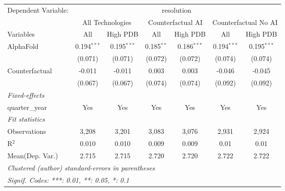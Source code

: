 \begingroup
\centering
\begin{tabular}{lcccccc}
   \tabularnewline \midrule \midrule
   Dependent Variable: & \multicolumn{6}{c}{resolution}\\
 & \multicolumn{2}{c}{All Technologies} & \multicolumn{2}{c}{Counterfactual AI} & \multicolumn{2}{c}{Counterfactual No AI} \\
\cmidrule(lr){1-1}\cmidrule(lr){2-3} \cmidrule(lr){4-5} \cmidrule(lr){6-7}
Variables & \multicolumn{1}{c}{All} & \multicolumn{1}{c}{High PDB} & \multicolumn{1}{c}{All} & \multicolumn{1}{c}{High PDB} & \multicolumn{1}{c}{All} & \multicolumn{1}{c}{High PDB} \\
\cmidrule(lr){1-1}\cmidrule(lr){2-2} \cmidrule(lr){3-3} \cmidrule(lr){4-4} \cmidrule(lr){5-5} \cmidrule(lr){6-6} \cmidrule(lr){7-7}
   AlphaFold      & 0.194$^{***}$ & 0.195$^{***}$ & 0.185$^{**}$ & 0.186$^{***}$ & 0.194$^{***}$ & 0.195$^{***}$\\   
                  & (0.071)       & (0.071)       & (0.072)      & (0.072)       & (0.074)       & (0.074)\\   
   Counterfactual & -0.011        & -0.011        & 0.003        & 0.003         & -0.046        & -0.045\\   
                  & (0.067)       & (0.067)       & (0.074)      & (0.074)       & (0.092)       & (0.092)\\   
   \midrule
   \emph{Fixed-effects}\\
   quarter\_year  & Yes           & Yes           & Yes          & Yes           & Yes           & Yes\\  
   \midrule
   \emph{Fit statistics}\\
   Observations   & 3,208         & 3,201         & 3,083        & 3,076         & 2,931         & 2,924\\  
   R$^2$          & 0.010         & 0.010         & 0.009        & 0.009         & 0.01          & 0.01\\  
Mean(Dep. Var.) & 2.715 & 2.715 & 2.720 & 2.720 & 2.722 & 2.722 \\
   \midrule \midrule
   \multicolumn{7}{l}{\emph{Clustered (author) standard-errors in parentheses}}\\
   \multicolumn{7}{l}{\emph{Signif. Codes: ***: 0.01, **: 0.05, *: 0.1}}\\
\end{tabular}
\par\endgroup
